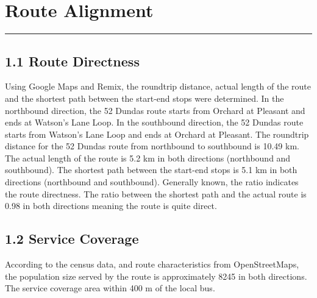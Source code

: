 \documentclass[
11pt, %
oneside, %
english, %
singlespacing, %
]{macthesis} %
\begin{document}
\mainmatter %
\pagestyle{thesis}
\hypertarget{route-alignment}{%
\chapter{Route Alignment}\label{route-alignment}}
\begin{center}\rule{0.5\linewidth}{0.5pt}\end{center}

\hypertarget{route-directness}{%
\section{1.1 Route Directness}\label{route-directness}}

Using Google Maps and Remix, the roundtrip distance, actual length of the route and the shortest path between the start-end stops were determined. In the northbound direction, the 52 Dundas route starts from Orchard at Pleasant and ends at Watson's Lane Loop. In the southbound direction, the 52 Dundas route starts from Watson's Lane Loop and ends at Orchard at Pleasant. The roundtrip distance for the 52 Dundas route from northbound to southbound is 10.49 km. The actual length of the route is 5.2 km in both directions (northbound and southbound). The shortest path between the start-end stops is 5.1 km in both directions (northbound and southbound). Generally known, the ratio indicates the route directness. The ratio between the shortest path and the actual route is 0.98 in both directions meaning the route is quite direct.

\hypertarget{service-coverage}{%
\section{1.2 Service Coverage}\label{service-coverage}}

According to the census data, and route characteristics from OpenStreetMaps, the population size served by the route is approximately 8245 in both directions. The service coverage area within 400 m of the local bus.
\end{document}
